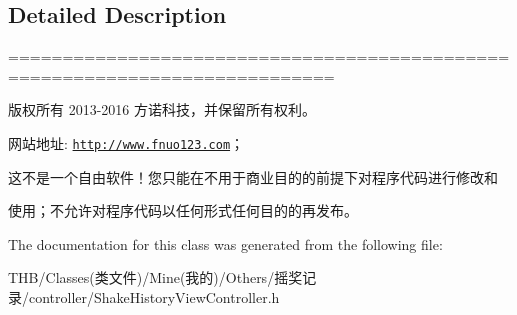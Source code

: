 \subsection{Detailed Description}
============================================================================

版权所有 2013-\/2016 方诺科技，并保留所有权利。

网站地址\+: \href{http://www.fnuo123.com}{\tt http\+://www.\+fnuo123.\+com}； 



这不是一个自由软件！您只能在不用于商业目的的前提下对程序代码进行修改和

使用；不允许对程序代码以任何形式任何目的的再发布。 

 

The documentation for this class was generated from the following file\+:\begin{DoxyCompactItemize}
\item 
T\+H\+B/\+Classes(类文件)/\+Mine(我的)/\+Others/摇奖记录/controller/Shake\+History\+View\+Controller.\+h\end{DoxyCompactItemize}
